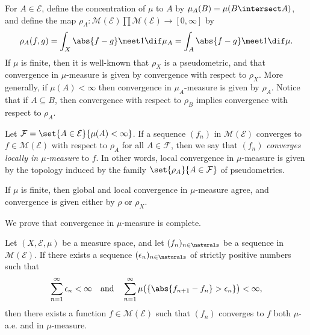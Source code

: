 \documentclass[article, a4paper, 11pt, oneside]{memoir}
\numberwithin{equation}{chapter}
\newcommand{\calE}{\mathcal{E}}
\newcommand{\calF}{\mathcal{F}}
\newcommand{\measurable}{\mathcal{M}}
\begin{document}
For $A \in \calE$, define the concentration of $\mu$ to $A$ by $\mu_A(B) = \mu(B \intersect A)$, and define the map $\rho_A \colon \measurable(\calE) \prod \measurable(\calE) \to [0,\infty]$ by
%
\begin{equation*}
    \rho_A(f,g)
        = \int_X \abs{f-g} \meet 1 \dif\mu_A
        = \int_A \abs{f-g} \meet 1 \dif\mu.
\end{equation*}
%
If $\mu$ is finite, then it is well-known that $\rho_X$ is a pseudometric, and that convergence in $\mu$-measure is given by convergence with respect to $\rho_X$. More generally, if $\mu(A) < \infty$ then convergence in $\mu_A$-measure is given by $\rho_A$. Notice that if $A \subseteq B$, then convergence with respect to $\rho_B$ implies convergence with respect to $\rho_A$.

Let $\calF = \set{A \in \calE}{\mu(A) < \infty}$. If a sequence $(f_n)$ in $\measurable(\calE)$ converges to $f \in \measurable(\calE)$ with respect to $\rho_A$ for all $A \in \calF$, then we say that $(f_n)$ \emph{converges locally in $\mu$-measure} to $f$. In other words, local convergence in $\mu$-measure is given by the topology induced by the family $\set{\rho_A}{A \in \calF}$ of pseudometrics.

If $\mu$ is finite, then global and local convergence in $\mu$-measure agree, and convergence is given either by $\rho$ or $\rho_X$.

We prove that convergence in $\mu$-measure is complete.

\begin{lemma}
    \label{thm:convergence-in-measure-lemma}
    Let $(X,\calE,\mu)$ be a measure space, and let $(f_n)_{n\in\naturals}$ be a sequence in $\measurable(\calE)$. If there exists a sequence $(\epsilon_n)_{n\in\naturals}$ of strictly positive numbers such that
    \begin{equation}
        \label{eq:convergence-in-measure-complete-lemma}
        \sum_{n=1}^\infty \epsilon_n < \infty
        \quad \text{and} \quad
        \sum_{n=1}^\infty \mu \bigl( \{ \abs{f_{n+1} - f_n} > \epsilon_n \} \bigr) < \infty,
    \end{equation}
    then there exists a function $f \in \measurable(\calE)$ such that $(f_n)$ converges to $f$ both $\mu$-a.e. and in $\mu$-measure.
\end{lemma}
\end{document}
